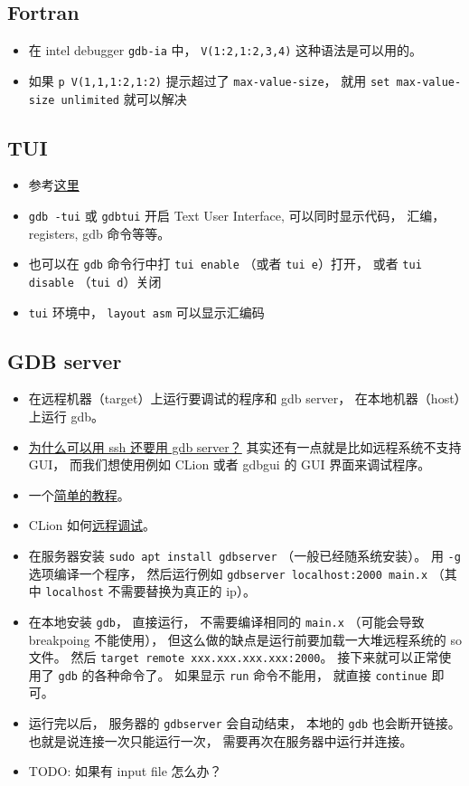 
\subsection{Fortran}
\begin{itemize}
\item 在 intel debugger \verb`gdb-ia` 中， \verb`V(1:2,1:2,3,4)` 这种语法是可以用的。
\item 如果 \verb`p V(1,1,1:2,1:2)` 提示超过了 \verb`max-value-size`， 就用 \verb`set max-value-size unlimited` 就可以解决
\end{itemize}

\subsection{TUI}
\begin{itemize}
\item 参考\href{https://developer.apple.com/library/archive/documentation/DeveloperTools/gdb/gdb/gdb_toc.html#TOC229}{这里}
\item \verb`gdb -tui` 或 \verb`gdbtui` 开启 Text User Interface, 可以同时显示代码， 汇编， registers, gdb 命令等等。
\item 也可以在 \verb|gdb| 命令行中打 \verb|tui enable| （或者 \verb|tui e|）打开， 或者 \verb|tui disable| （\verb|tui d|）关闭
\item \verb|tui| 环境中， \verb|layout asm| 可以显示汇编码
\end{itemize}


\subsection{GDB server}
\begin{itemize}
\item 在远程机器（target）上运行要调试的程序和 gdb server， 在本地机器（host）上运行 gdb。
\item \href{https://stackoverflow.com/questions/69176457/the-difference-between-gdbserver-and-remote-gdb}{为什么可以用 ssh 还要用 gdb server？} 其实还有一点就是比如远程系统不支持 GUI， 而我们想使用例如 CLion 或者 gdbgui 的 GUI 界面来调试程序。
\item 一个\href{https://www.thegeekstuff.com/2014/04/gdbserver-example/}{简单的教程}。
\item CLion 如何\href{https://www.jetbrains.com/help/clion/remote-debug.html}{远程调试}。
\item 在服务器安装 \verb|sudo apt install gdbserver| （一般已经随系统安装）。 用 \verb|-g| 选项编译一个程序， 然后运行例如 \verb|gdbserver localhost:2000 main.x| （其中 \verb|localhost| 不需要替换为真正的 ip）。
\item 在本地安装 \verb|gdb|， 直接运行， 不需要编译相同的 \verb|main.x| （可能会导致 breakpoing 不能使用）， 但这么做的缺点是运行前要加载一大堆远程系统的 so 文件。 然后 \verb|target remote xxx.xxx.xxx.xxx:2000|。 接下来就可以正常使用了 \verb|gdb| 的各种命令了。 如果显示 \verb|run| 命令不能用， 就直接 \verb|continue| 即可。
\item 运行完以后， 服务器的 \verb|gdbserver| 会自动结束， 本地的 \verb|gdb| 也会断开链接。 也就是说连接一次只能运行一次， 需要再次在服务器中运行并连接。
\item TODO: 如果有 input file 怎么办？
\end{itemize}
